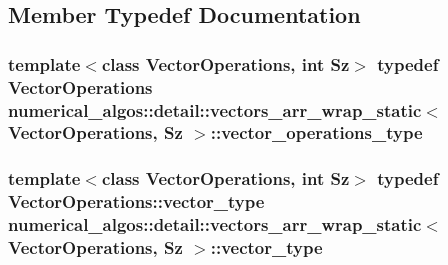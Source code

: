 \subsection{Member Typedef Documentation}
\hypertarget{structnumerical__algos_1_1detail_1_1vectors__arr__wrap__static_a4de11cdce0c015a0b78f2171fd8680c0}{
\subsubsection[{vector\-\_\-operations\-\_\-type}]{\setlength{\rightskip}{0pt plus 5cm}template$<$class Vector\-Operations, int Sz$>$ typedef Vector\-Operations {\bf numerical\-\_\-algos\-::detail\-::vectors\-\_\-arr\-\_\-wrap\-\_\-static}$<$ Vector\-Operations, Sz $>$\-::{\bf vector\-\_\-operations\-\_\-type}}}\label{structnumerical__algos_1_1detail_1_1vectors__arr__wrap__static_a4de11cdce0c015a0b78f2171fd8680c0}
\hypertarget{structnumerical__algos_1_1detail_1_1vectors__arr__wrap__static_ae21a4b4f6af2d7a042e02f41234c1ea0}{
\subsubsection[{vector\-\_\-type}]{\setlength{\rightskip}{0pt plus 5cm}template$<$class Vector\-Operations, int Sz$>$ typedef Vector\-Operations\-::vector\-\_\-type {\bf numerical\-\_\-algos\-::detail\-::vectors\-\_\-arr\-\_\-wrap\-\_\-static}$<$ Vector\-Operations, Sz $>$\-::{\bf vector\-\_\-type}}}\label{structnumerical__algos_1_1detail_1_1vectors__arr__wrap__static_ae21a4b4f6af2d7a042e02f41234c1ea0}
